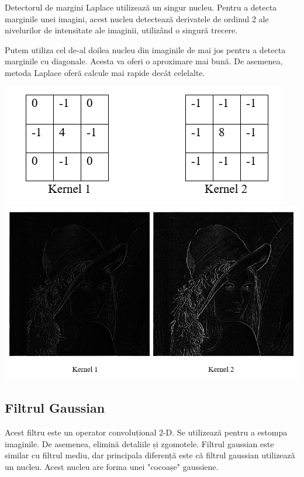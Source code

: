 \documentclass[10pt]{article}
\begin{document}
\> Detectorul de margini Laplace utilizează un singur nucleu.
Pentru a detecta marginile unei imagini, acest nucleu detectează derivatele de ordinul 2 ale nivelurilor de
intensitate ale imaginii, utilizând o singură trecere.

\> Putem utiliza cel de-al doilea nucleu din imaginile de mai jos pentru a detecta marginile cu diagonale.
Acesta va oferi o aproximare mai bună. De asemenea, metoda Laplace oferă calcule mai rapide decât celelalte.

\begin{center}

  \includegraphics[scale=0.5]{filtru-laplacian-masca}
  \includegraphics[scale=0.5]{filtru-laplacian}

\end{center}

\newpage


\subsection{Filtrul Gaussian}

\> Acest filtru este un operator convoluțional 2-D. Se utilizează pentru a estompa imaginile.
De asemenea, elimină detaliile și zgomotele. Filtrul gaussian este similar cu filtrul mediu,
dar principala diferență este că filtrul gaussian utilizează un nucleu. Acest nucleu are forma unei "cocoașe" gaussiene.
\end{document}
